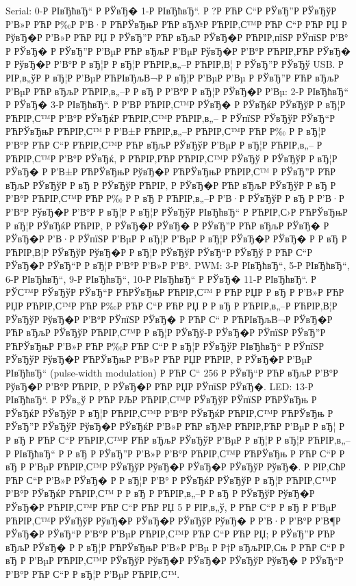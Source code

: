 \documentclass[a4paper,14pt]{extarticle}
\begin{document}
    Serial: 0-Р  РІвЂћвЂ“ Р  РЎвЂ� 1-Р  РІвЂћвЂ“. Р  ?Р РЋР С“Р  РЎвЂ”Р  РЎвЂўР  Р’В»Р РЋР Р‰Р  Р’В·Р РЋРЎвЂњР РЋР вЂ№Р РЋРІР‚С™Р РЋР С“Р РЋР РЏ Р  РўвЂ�Р  Р’В»Р РЋР РЏ Р  РЎвЂ”Р РЋР вЂљР  РЎвЂ�Р РЋРІР‚пїЅР  РЎпїЅР  Р’В° Р  РЎвЂ� Р  РЎвЂ”Р  Р’ВµР РЋР вЂљР  Р’ВµР  РўвЂ�Р  Р’В°Р РЋРІР‚РЋР  РЎвЂ� Р  РўвЂ�Р  Р’В°Р  Р вЂ¦Р  Р вЂ¦Р РЋРІР‚в„–Р РЋРІР‚В¦ Р  РЎвЂ”Р  РЎвЂў USB.
    Р  РІР‚в„ўР  Р вЂ¦Р  Р’ВµР РЋРІвЂљВ¬Р  Р вЂ¦Р  Р’ВµР  Р’Вµ Р  РЎвЂ”Р РЋР вЂљР  Р’ВµР РЋР вЂљР РЋРІР‚в„–Р  Р вЂ Р  Р’В°Р  Р вЂ¦Р  РЎвЂ�Р  Р’Вµ: 2-Р  РІвЂћвЂ“ Р  РЎвЂ� 3-Р  РІвЂћвЂ“. Р  Р’В­Р РЋРІР‚С™Р  РЎвЂ� Р  РЎвЂќР  РЎвЂўР  Р вЂ¦Р РЋРІР‚С™Р  Р’В°Р  РЎвЂќР РЋРІР‚С™Р РЋРІР‚в„– Р  РЎпїЅР  РЎвЂўР  РЎвЂ“Р РЋРЎвЂњР РЋРІР‚С™ Р  Р’В±Р РЋРІР‚в„–Р РЋРІР‚С™Р РЋР Р‰ Р  Р вЂ¦Р  Р’В°Р РЋР С“Р РЋРІР‚С™Р РЋР вЂљР  РЎвЂўР  Р’ВµР  Р вЂ¦Р РЋРІР‚в„– Р РЋРІР‚С™Р  Р’В°Р  РЎвЂќ, Р РЋРІР‚РЋР РЋРІР‚С™Р  РЎвЂў Р  РЎвЂўР  Р вЂ¦Р  РЎвЂ� Р  Р’В±Р РЋРЎвЂњР  РўвЂ�Р РЋРЎвЂњР РЋРІР‚С™ Р  РЎвЂ”Р РЋР вЂљР  РЎвЂўР  Р вЂ Р  РЎвЂўР РЋРІР‚ Р  РЎвЂ�Р РЋР вЂљР  РЎвЂўР  Р вЂ Р  Р’В°Р РЋРІР‚С™Р РЋР Р‰ Р  Р вЂ Р РЋРІР‚в„–Р  Р’В·Р  РЎвЂўР  Р вЂ  Р  Р’В·Р  Р’В°Р  РўвЂ�Р  Р’В°Р  Р вЂ¦Р  Р вЂ¦Р  РЎвЂўР  РІвЂћвЂ“ Р РЋРІР‚С›Р РЋРЎвЂњР  Р вЂ¦Р  РЎвЂќР РЋРІР‚ Р  РЎвЂ�Р  РЎвЂ� Р  РЎвЂ”Р РЋР вЂљР  РЎвЂ� Р  РЎвЂ�Р  Р’В·Р  РЎпїЅР  Р’ВµР  Р вЂ¦Р  Р’ВµР  Р вЂ¦Р  РЎвЂ�Р  РЎвЂ� Р  Р вЂ Р РЋРІР‚В¦Р  РЎвЂўР  РўвЂ�Р  Р вЂ¦Р  РЎвЂўР  РЎвЂ“Р  РЎвЂў Р РЋР С“Р  РЎвЂ�Р  РЎвЂ“Р  Р вЂ¦Р  Р’В°Р  Р’В»Р  Р’В°.
    PWM: 3-Р  РІвЂћвЂ“, 5-Р  РІвЂћвЂ“, 6-Р  РІвЂћвЂ“, 9-Р  РІвЂћвЂ“, 10-Р  РІвЂћвЂ“ Р  РЎвЂ� 11-Р  РІвЂћвЂ“. Р  РЎС™Р  РЎвЂўР  РЎвЂ“Р РЋРЎвЂњР РЋРІР‚С™ Р РЋР РЏР  Р вЂ Р  Р’В»Р РЋР РЏР РЋРІР‚С™Р РЋР Р‰Р РЋР С“Р РЋР РЏ Р  Р вЂ Р РЋРІР‚в„–Р РЋРІР‚В¦Р  РЎвЂўР  РўвЂ�Р  Р’В°Р  РЎпїЅР  РЎвЂ� Р РЋР С“ Р РЋРІвЂљВ¬Р  РЎвЂ�Р РЋР вЂљР  РЎвЂўР РЋРІР‚С™Р  Р вЂ¦Р  РЎвЂў-Р  РЎвЂ�Р  РЎпїЅР  РЎвЂ”Р РЋРЎвЂњР  Р’В»Р РЋР Р‰Р РЋР С“Р  Р вЂ¦Р  РЎвЂўР  РІвЂћвЂ“ Р  РЎпїЅР  РЎвЂўР  РўвЂ�Р РЋРЎвЂњР  Р’В»Р РЋР РЏР РЋРІР‚ Р  РЎвЂ�Р  Р’ВµР  РІвЂћвЂ“ (pulse-width modulation) Р РЋР С“ 256 Р  РЎвЂ“Р РЋР вЂљР  Р’В°Р  РўвЂ�Р  Р’В°Р РЋРІР‚ Р  РЎвЂ�Р РЋР РЏР  РЎпїЅР  РЎвЂ�.
    LED: 13-Р  РІвЂћвЂ“. Р  РЎв„ў Р РЋР РЉР РЋРІР‚С™Р  РЎвЂўР  РЎпїЅР РЋРЎвЂњ Р  РЎвЂќР  РЎвЂўР  Р вЂ¦Р РЋРІР‚С™Р  Р’В°Р  РЎвЂќР РЋРІР‚С™Р РЋРЎвЂњ Р  РЎвЂ”Р  РЎвЂўР  РўвЂ�Р  РЎвЂќР  Р’В»Р РЋР вЂ№Р РЋРІР‚РЋР  Р’ВµР  Р вЂ¦ Р  Р вЂ Р РЋР С“Р РЋРІР‚С™Р РЋР вЂљР  РЎвЂўР  Р’ВµР  Р вЂ¦Р  Р вЂ¦Р РЋРІР‚в„–Р  РІвЂћвЂ“ Р  Р вЂ  Р  РЎвЂ”Р  Р’В»Р  Р’В°Р РЋРІР‚С™Р РЋРЎвЂњ Р РЋР С“Р  Р вЂ Р  Р’ВµР РЋРІР‚С™Р  РЎвЂўР  РўвЂ�Р  РЎвЂ�Р  РЎвЂўР  РўвЂ�. Р  РІР‚СћР РЋР С“Р  Р’В»Р  РЎвЂ� Р  Р вЂ¦Р  Р’В° Р  РЎвЂќР  РЎвЂўР  Р вЂ¦Р РЋРІР‚С™Р  Р’В°Р  РЎвЂќР РЋРІР‚С™ Р  Р вЂ Р РЋРІР‚в„–Р  Р вЂ Р  РЎвЂўР  РўвЂ�Р  РЎвЂ�Р РЋРІР‚С™Р РЋР С“Р РЋР РЏ 5 Р  РІР‚в„ў, Р РЋР С“Р  Р вЂ Р  Р’ВµР РЋРІР‚С™Р  РЎвЂўР  РўвЂ�Р  РЎвЂ�Р  РЎвЂўР  РўвЂ� Р  Р’В·Р  Р’В°Р  Р’В¶Р  РЎвЂ�Р  РЎвЂ“Р  Р’В°Р  Р’ВµР РЋРІР‚С™Р РЋР С“Р РЋР РЏ; Р  РЎвЂ”Р РЋР вЂљР  РЎвЂ� Р  Р вЂ¦Р РЋРЎвЂњР  Р’В»Р  Р’Вµ Р Р†Р вЂљРІР‚Сњ Р РЋР С“Р  Р вЂ Р  Р’ВµР РЋРІР‚С™Р  РЎвЂўР  РўвЂ�Р  РЎвЂ�Р  РЎвЂўР  РўвЂ� Р  РЎвЂ“Р  Р’В°Р РЋР С“Р  Р вЂ¦Р  Р’ВµР РЋРІР‚С™.
\end{document}
